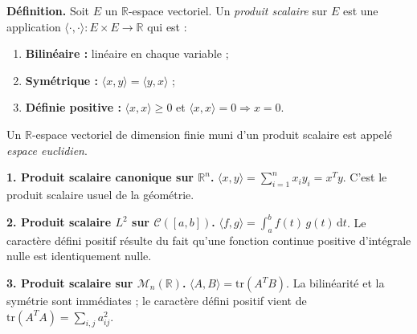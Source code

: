 ﻿%



\begin{tcolorbox}[thmbox]
  \textbf{Définition.}\enspace%
  Soit $E$ un $\mathbb{R}$-espace vectoriel. Un \emph{produit scalaire} sur $E$
  est une application $\langle\cdot,\cdot\rangle : E \times E \to \mathbb{R}$
  qui est :
  \begin{enumerate}
    \item \textbf{Bilinéaire :} linéaire en chaque variable ;
    \item \textbf{Symétrique :} $\langle x,y\rangle = \langle y,x\rangle$ ;
    \item \textbf{Définie positive :} $\langle x,x\rangle \geq 0$ et
          $\langle x,x\rangle = 0 \Rightarrow x = 0$.
  \end{enumerate}
  Un $\mathbb{R}$-espace vectoriel de dimension finie muni d'un produit
  scalaire est appelé \emph{espace euclidien}.
\end{tcolorbox}

\begin{mdframed}[style=exbar]
  \textbf{1. Produit scalaire canonique sur $\mathbb{R}^n$.}\enspace%
  $\langle x,y\rangle = \displaystyle\sum_{i=1}^n x_i y_i = x^T y$.
  C'est le produit scalaire usuel de la géométrie.

  \smallskip\noindent
  \textbf{2. Produit scalaire $L^2$ sur $\mathcal{C}([a,b])$.}\enspace%
  $\langle f,g\rangle = \displaystyle\int_a^b f(t)\,g(t)\,\mathrm{d}t$.
  Le caractère défini positif résulte du fait qu'une fonction continue positive
  d'intégrale nulle est identiquement nulle.

  \smallskip\noindent
  \textbf{3. Produit scalaire sur $\mathcal{M}_n(\mathbb{R})$.}\enspace%
  $\langle A,B\rangle = \mathrm{tr}(A^T B)$.
  La bilinéarité et la symétrie sont immédiates ; le caractère défini positif
  vient de $\mathrm{tr}(A^T A) = \sum_{i,j} a_{ij}^2$.
\end{mdframed}

